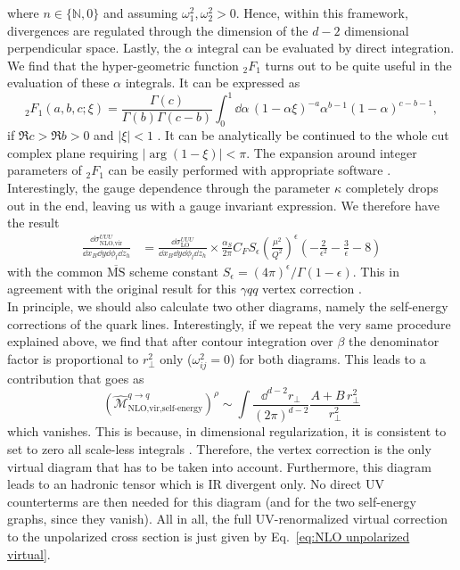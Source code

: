 where $n\in \{\mathbb{N},0\}$ and assuming $\omega^2_1,\omega^2_2>0$. Hence, within this framework, divergences are regulated through the dimension of the $d-2$ dimensional perpendicular space. Lastly, the $\alpha$ integral can be evaluated by direct integration. We find that the hyper-geometric function ${}_2F_1$ turns out to be quite useful in the evaluation of these $\alpha$ integrals. It can be expressed as \cite{dennery2012mathematics}
\begin{equation}
    {}_2F_1(a,b,c;\xi)=\frac{\Gamma(c)}{\Gamma(b)\Gamma(c-b)}\int_0^1  \dd \alpha\,(1-\alpha \xi)^{-a} \alpha^{b-1} (1-\alpha)^{c-b-1},
\end{equation}
if $\Re c> \Re b  >0  $ and $|\xi| < 1$ . It can be analytically be continued to the whole cut complex plane requiring $|\arg(1-\xi)|<\pi$. The expansion around integer parameters of ${}_2F_1$  can be easily performed with appropriate software \cite{Huber_2006}. Interestingly, the gauge dependence through the parameter $\kappa$ completely drops out in the end, leaving us with a gauge invariant expression. We therefore have the result
\begin{equation}\label{eq:NLO unpolarized virtual}
\begin{aligned}
      \frac{\dd \sigma^{UUU}_{\text{NLO,vir}}}{\dd x_B \dd y \dd \phi_l \dd z_h}&= \frac{\dd \sigma^{UUU}_{\text{LO}}}{\dd x_B \dd y \dd \phi_l \dd z_h}\times\frac{\alpha_S}{2\pi}  C_F S_\epsilon \left(\frac{\mu^2}{Q^2}\right)^{\epsilon}\left(-\frac{2}{\epsilon^2}-\frac{3}{\epsilon}-8\right)
\end{aligned}
\end{equation}
with the common $\overline{\text{MS}}$ scheme constant $S_\epsilon=(4\pi)^\epsilon/\Gamma(1-\epsilon)$. This in agreement with the original result for this $\gamma q q$ vertex correction \cite{altarelli_large_1979}. \\
In principle, we should also calculate two other diagrams, namely the self-energy corrections of the quark lines. Interestingly, if we repeat the very same procedure explained above, we find that after contour integration over $\beta$ the denominator factor is proportional to $r_\perp^2$ only ($\omega^2_{ij}=0$) for both diagrams. This leads to a contribution that goes as
\begin{equation}
     (\hat{\mathcal{M}}^{q \to q}_{\text{NLO,vir,self-energy}})^\rho\sim\int\frac{\dd^{d-2} r_\perp}{(2\pi)^{d-2}}\frac{A+B\,r_\perp^2}{r_\perp^2}
\end{equation}
which vanishes. This is because, in dimensional regularization, it is consistent to set to zero all scale-less integrals \cite{Schwartz:2014sze}. Therefore, the vertex correction is the only virtual diagram that has to be taken into account. Furthermore, this diagram leads to an hadronic tensor which is IR divergent only. No direct UV counterterms are then needed for this diagram (and for the two self-energy graphs, since they vanish). All in all, the full UV-renormalized virtual correction to the unpolarized cross section is just given by Eq.~\ref{eq:NLO unpolarized virtual}.

